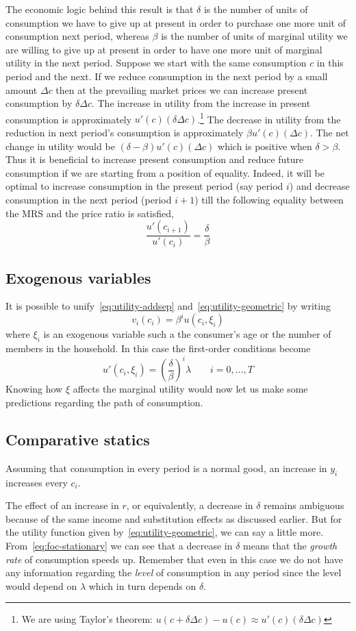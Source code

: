 \documentclass[12pt,reqno]{amsart}
\begin{document}
The economic logic behind this result is that $\delta$ is the number of
units of consumption we have to give up at present in order to
purchase one more unit of consumption next period, whereas $\beta$ is
the number of units of marginal utility we are willing to give up at
present in order to have one more unit of marginal utility in the next
period. Suppose we start with the same consumption $c$ in this period and
the next. If we reduce consumption in the next period by a small
amount $\Delta c$ then at the prevailing market prices we can
increase present consumption by $\delta\Delta c$. The increase in
utility from the increase in present consumption is approximately
$u'(c)(\delta\Delta c)$.\footnote{We are using Taylor's theorem:
  $u(c+\delta\Delta c)-u(c) \approx u'(c)(\delta\Delta c)$} The decrease in utility from the reduction in
next period's consumption is approximately $\beta u'(c)(\Delta c)$. The
net change in utility would be $(\delta-\beta)u'(c)(\Delta c)$ which
is positive when $\delta>\beta$. Thus it is beneficial to increase present consumption and
reduce future consumption if we are starting from a position of
equality. Indeed, it will be optimal to increase consumption in the
present period (say period $i$) and decrease consumption in the next
period (period $i+1$) till the following equality between the MRS and
the price ratio is satisfied,
\[\frac{u'(c_{i+1})}{u'(c_i)}=\frac{\delta}{\beta}\]
\subsection{Exogenous variables}
It is possible to unify~\eqref{eq:utility-addsep}
and~\eqref{eq:utility-geometric} by writing
\[v_i(c_i)=\beta^i u(c_i,\xi_i)\]
where $\xi_i$ is an exogenous variable such a the consumer's age or
the number of members in the household. In this case the first-order
conditions become
\[u'(c_i,\xi_i)=\left(\frac{\delta}{\beta}\right)^i \lambda \qquad
i=0,\ldots,T\]
Knowing how $\xi$ affects the marginal utility would
now let us make some predictions regarding the path of consumption.

\subsection{Comparative statics}
Assuming that consumption in every period is a normal good, an
increase in $y_i$ increases every $c_i$.

The effect of an increase in $r$, or equivalently, a decrease in
$\delta$ remains ambiguous because of the same income and substitution
effects as discussed earlier. But for the utility function given
by~\eqref{eq:utility-geometric}, we can say a little
more. From~\eqref{eq:foc-stationary} we can see that a decrease in
$\delta$ means that the \emph{growth rate} of consumption speeds
up. Remember that even in this case we do not have any information
regarding the \emph{level} of consumption in any period since the
level would depend on $\lambda$ which in turn depends on $\delta$.
\end{document}
